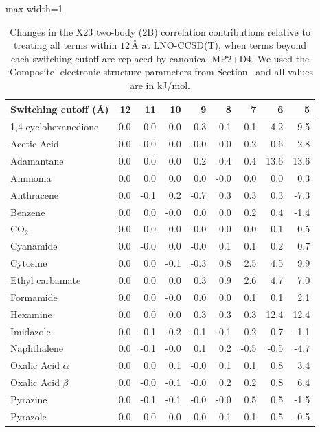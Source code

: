 \begin{table}[h]
\centering
\caption{\label{tab:x23_2b_multilevel_mp2_d4}Changes in the X23 two-body (2B) correlation contributions relative to treating all terms within $12\,$\AA{} at LNO-CCSD(T), when terms beyond each switching cutoff are replaced by canonical MP2+D4. We used the `Composite' electronic structure parameters from Section~ and all values are in kJ/mol.}
\begin{adjustbox}{max width=1\textwidth}
\begin{tabular}{lrrrrrrrr}
\toprule
Switching cutoff (\AA{}) & 12 & 11 & 10 & 9 & 8 & 7 & 6 & 5 \\ 
\midrule
1,4-cyclohexanedione & 0.0 & 0.0 & 0.0 & 0.3 & 0.1 & 0.1 & 4.2 & 9.5 \\
Acetic Acid & 0.0 & -0.0 & 0.0 & -0.0 & 0.0 & 0.2 & 0.6 & 2.8 \\
Adamantane & 0.0 & 0.0 & 0.0 & 0.2 & 0.4 & 0.4 & 13.6 & 13.6 \\
Ammonia & 0.0 & 0.0 & 0.0 & 0.0 & -0.0 & 0.0 & 0.0 & 0.3 \\
Anthracene & 0.0 & -0.1 & 0.2 & -0.7 & 0.3 & 0.3 & 0.3 & -7.3 \\
Benzene & 0.0 & 0.0 & -0.0 & 0.0 & 0.0 & 0.2 & 0.4 & -1.4 \\
CO$_2$ & 0.0 & 0.0 & 0.0 & -0.0 & 0.0 & -0.0 & 0.1 & 0.5 \\
Cyanamide & 0.0 & -0.0 & 0.0 & -0.0 & 0.1 & 0.1 & 0.2 & 0.7 \\
Cytosine & 0.0 & 0.0 & -0.1 & -0.3 & 0.8 & 2.5 & 4.5 & 9.9 \\
Ethyl carbamate & 0.0 & 0.0 & 0.0 & 0.3 & 0.9 & 2.6 & 4.7 & 7.0 \\
Formamide & 0.0 & 0.0 & -0.0 & 0.0 & 0.0 & 0.1 & 0.1 & 2.1 \\
Hexamine & 0.0 & 0.0 & 0.0 & 0.3 & 0.3 & 0.3 & 12.4 & 12.4 \\
Imidazole & 0.0 & -0.1 & -0.2 & -0.1 & -0.1 & 0.2 & 0.7 & -1.1 \\
Naphthalene & 0.0 & -0.1 & -0.0 & 0.1 & 0.2 & -0.5 & -0.5 & -4.7 \\
Oxalic Acid $\alpha$ & 0.0 & 0.0 & 0.1 & -0.0 & 0.1 & 0.1 & 0.8 & 3.4 \\
Oxalic Acid $\beta$ & 0.0 & -0.0 & -0.1 & -0.0 & 0.2 & 0.2 & 0.8 & 6.4 \\
Pyrazine & 0.0 & -0.1 & -0.1 & -0.0 & -0.0 & 0.5 & 0.5 & -1.5 \\
Pyrazole & 0.0 & 0.0 & 0.0 & -0.0 & 0.1 & 0.1 & 0.5 & -0.5 \\

\end{tabular}
\end{adjustbox}
\end{table}
